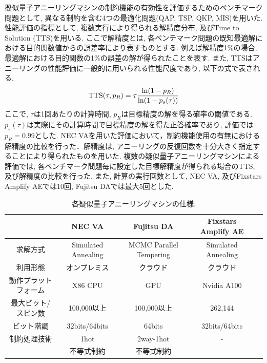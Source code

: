 \documentclass[submit,techrep,noauthor]{ipsj}
\begin{document}
擬似量子アニーリングマシンの制約機能の有効性を評価するためのベンチマーク問題として, 異なる制約を含む4つの最適化問題(QAP, TSP, QKP, MIS)を用いた. 性能評価の指標として, 複数実行により得られる解精度分布, 及びTime to Solution (TTS)を用いる. ここで解精度とは, 各ベンチマーク問題の既知最適解における目的関数値からの誤差率により表すものとする. 例えば解精度1\%の場合, 最適解における目的関数の1\%の誤差の解が得られたことを表す. また, TTSはアニーリングの性能評価に一般的に用いられる性能尺度であり, 以下の式で表される.
\begin{equation}
{\rm{TTS}}(\tau, p_{R}) = \tau\frac{{\rm{ln}}(1-p_{R})}{{\rm{ln}}(1-p_{s}(\tau))} \label{tts_def}
\end{equation}
ここで, $\tau$は1回あたりの計算時間, $p_{R}$は目標精度の解を得る確率の閾値である. $p_{s}(\tau)$は実際にその計算時間で目標精度の解を得た正答確率であり, 評価では$p_{R}=0.99$とした. 
NEC VAを用いた評価において，制約機能使用の有無における解精度の比較を行った．解精度は, アニーリングの反復回数を十分大きく指定することにより得られたものを用いた. 複数の疑似量子アニーリングマシンによる評価では, 各ベンチマーク問題毎に設定した目標解精度が得られる場合のTTS, 及び解精度の比較を行った. また, 計算の実行回数として, NEC VA, 及びFixstars Amplify AEでは10回, Fujitsu DAでは最大5回とした.

\newlength{\myheight}
\setlength{\myheight}{0.8cm}

\begin{table}[tb]
\centering
  \caption{各疑似量子アニーリングマシンの仕様.}
    \begin{tabular}{|c||c|c|c|c}
      \hline
      \parbox[c][\myheight][c]{0cm}{}
      & {NEC VA} & {Fujitsu DA} & {Fixstars Amplify AE}\\ \hline \hline
      求解方式 & Simulated Annealing & MCMC Parallel Tempering & Simulated Annealing\\ \hline
      利用形態 & オンプレミス & クラウド & クラウド\\ \hline
      動作プラットフォーム & X86 CPU & GPU & Nvidia A100\\ \hline
      最大ビット/スピン数 & 100,000以上 & 100,000以上 & 262,144\\ \hline
      ビット階調 & 32bits/64bits & 64bits & 32bits/64bits\\ \hline
      制約処理技術 & 1hot & 2way-1hot  & -\\ 
      {} & 不等式制約 & 不等式制約 & {}\\ \hline
  \end{tabular}
\label{table_spec}
\end{table}
\end{document}
